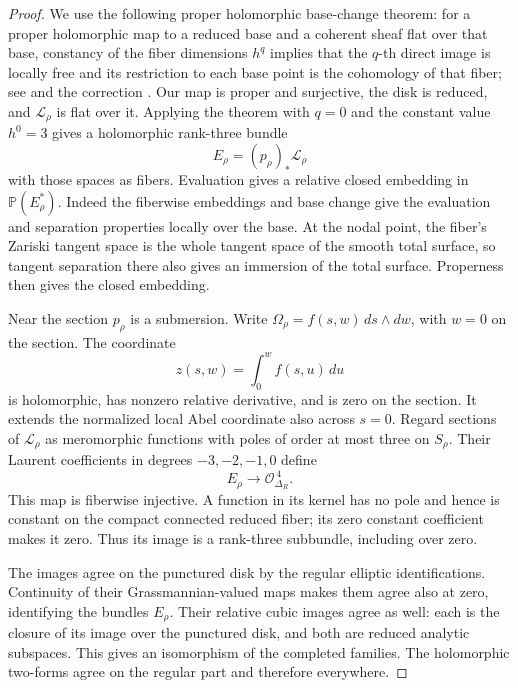 \begin{proof}
We use the following proper holomorphic base-change theorem: for a
proper holomorphic map to a reduced base and a coherent sheaf flat
over that base, constancy of the fiber dimensions \(h^q\) implies
that the \(q\)-th direct image is locally free and its restriction
to each base point is the cohomology of that fiber; see
\cite[Section~7, Satz~5]{Grauert1960} and the correction
\cite{Grauert1963}.  Our map is proper and
surjective, the disk is reduced, and \(\mathcal L_\rho\) is flat
over it.  Applying the theorem with \(q=0\) and the constant value
\(h^0=3\) gives a holomorphic rank-three bundle
\[
 E_\rho=(p_\rho)_*\mathcal L_\rho
\]
with those spaces as fibers.  Evaluation gives a relative closed
embedding in \(\mathbb P(E_\rho^*)\).
Indeed the fiberwise embeddings and base change give the
evaluation and separation properties locally over the base.
At the nodal point, the fiber's Zariski tangent space is the whole
tangent space of the smooth total surface, so tangent separation
there also gives an immersion of the total surface.  Properness
then gives the closed embedding.

Near the section \(p_\rho\) is a submersion.  Write
\(\Omega_\rho=f(s,w)\,ds\wedge dw\), with \(w=0\) on the section.
The coordinate
\[
 z(s,w)=\int_0^w f(s,u)\,du
\]
is holomorphic, has nonzero relative derivative, and is zero on
the section.  It extends the normalized local Abel coordinate
also across \(s=0\).
Regard sections of \(\mathcal L_\rho\) as meromorphic functions
with poles of order at most three on \(S_\rho\).
Their Laurent coefficients in degrees \(-3,-2,-1,0\) define
\begin{equation}\label{eq:nodal-jet-map}
 E_\rho\longrightarrow\mathcal O_{\Delta_R}^{\,4}.
\end{equation}
This map is fiberwise injective.  A function in its kernel has
no pole and hence is constant on the compact connected reduced
fiber; its zero constant coefficient makes it zero.
Thus its image is a rank-three subbundle, including over zero.

The images agree on the punctured disk by the regular elliptic
identifications.  Continuity of their Grassmannian-valued maps
makes them agree also at zero, identifying the bundles \(E_\rho\).
Their relative cubic images agree as well: each is the closure
of its image over the punctured disk, and both are reduced
analytic subspaces.  This gives an isomorphism of the completed
families.  The holomorphic two-forms agree on the regular part
and therefore everywhere.
\end{proof}

